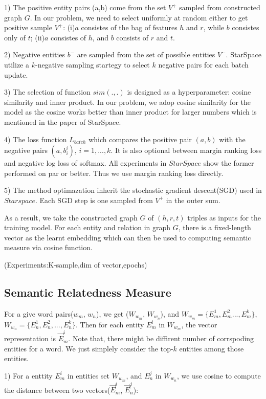 1) The positive entity pairs (a,b) come from the set $V^+$ sampled from constructed graph $G$. 
In our problem, we need to select uniformly at random either to get positive sample $V^+$:
(i)$a$ consistes of the bag of features $h$ and $r$, while $b$ consistes only of $t$; 
(ii)$a$ consistes of $h$, and $b$ consists of $r$ and $t$. 

2) Negative entities $b^-$ are sampled from the set of possible entities $V^-$.  
StarSpace utilize a $k$-negative sampling startegy\cite{corr/Mikolov13} to select $k$ negative pairs for each batch update. 

3) The selection of function $sim(.,.)$ is designed as a hyperparameter: cosine similarity and inner product.
In our problem, we adop cosine similarity for the model as the cosine works better than inner product for
larger numbers which is mentioned in the paper of StarSpace.

4) The loss function $L_{batch}$ which compares the positive pair $(a,b)$ with the negative pairs $(a, b_i^i)$, $i=1,...,k$.
It is also optional between margin ranking loss and negative log loss of softmax. All experiments in $StarSpace$ show
the former performed on par or better. Thus we use margin ranking loss directly.

5) The method optimazation inherit the stochastic gradient descent(SGD) used in $Starspace$. Each SGD step is one
sampled from $V^+$ in the outer sum.

As a result, we take the constructed graph $G$ of $(h, r, t)$ triples as inputs for the training model.
For each entity and relation in graph $G$, there is a fixed-length vector as the learnt embedding which
can then be used to computing semantic measure via cosine function.

(Experiments:K-sample,dim of vector,epochs)


\subsection{Semantic Relatedness Measure}
For a give word pairs($w_m$, $w_n$), we get ($W_{w_m}$, $W_{w_n}$), and $W_{w_m}=\{E_m^1,E_m^2...,E_m^k\}$,
$W_{w_n}=\{E_n^1,E_n^2,...,E_n^k\}$. Then for each entity $E_m^i$ in $W_{w_m}$, the vector representation is
$\overrightarrow E_m^i$.
Note that, there might be diffirent number of corrspoding entities for a
word. We just simplely consider the top-$k$ entities among those entities.

1) For a enttity $E_m^i$ in entities set $W_{w_m}$, and $E_n^j$ in  $W_{w_n}$, we use cosine to compute the
distance between two vectors($\overrightarrow E_m^i$, $\overrightarrow E_n^j$):

